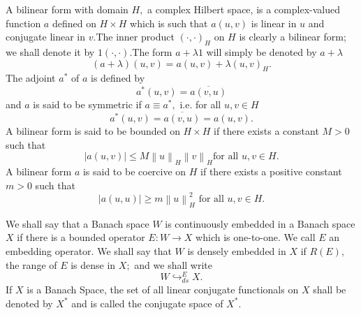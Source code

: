 \documentclass{article}
\begin{document}
A bilinear form with domain $H,$ a complex Hilbert space, is a
complex-valued function $a$ defined on $H\times H$ which is such that $%
a(u,v) $ is linear in $u$ and conjugate linear in $v.$The inner product $%
\left( \cdot ,\cdot \right) _{H}$ on $H$ is clearly a bilinear form; we
shall denote it by $1\left( \cdot ,\cdot \right) .$The form $a+\lambda 1$
will simply be denoted by $a+\lambda $%
\begin{equation*}
\left( a+\lambda \right) (u,v)=a(u,v)+\lambda (u,v)_{H}.
\end{equation*}%
The adjoint $a^{\ast }$ of $a$ is defined by 
\begin{equation*}
a^{\ast }(u,v)=\overline{a(v,u)}
\end{equation*}%
and $a$ is said to be symmetric if $a\equiv a^{\ast },$ i.e. for all $u,v\in
H$%
\begin{equation*}
a^{\ast }(u,v)=\overline{a(v,u)}=a(u,v).
\end{equation*}%
A bilinear form is said to be bounded on $H\times H$ if there exists a
constant $M>0$ such that 
\begin{equation*}
\left| a(u,v)\right| \leq M\left\| u\right\| _{H}\left\| v\right\| _{H}\text{
\ \ \ \ for all }u,v\in H.
\end{equation*}%
A bilinear form $a$ is said to be coercive on $H$ if there exists a positive
constant $m>0$ such that%
\begin{equation*}
\left| a(u,u)\right| \geq m\left\| u\right\| _{H}^{2}\text{\ \ \ \ \ for all 
}u,v\in H.
\end{equation*}

We shall say that a Banach space $W$ is continuously embedded in a Banach
space $X$ if there is a bounded operator $E:W\rightarrow X$ which is
one-to-one. We call $E$ an embedding operator. We shall say that $W$ is
densely embedded in $X$ if $R(E),$ the range of $E$ is dense in $X;$ and we
shall write 
\begin{equation*}
W\hookrightarrow _{ds}^{E}X.
\end{equation*}%
If $X$ is a Banach Space, the set of all linear conjugate functionals on $X$
shall be denoted by $X^{\ast }$ and is called the conjugate space of $%
X^{\ast }.$
\end{document}
